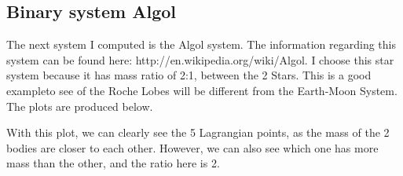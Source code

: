\documentclass{article}
\begin{document}
\subsection{Binary system Algol}
The next system I computed is the Algol system. The information regarding this system can be found here: http://en.wikipedia.org/wiki/Algol. I choose this star system because it has mass ratio of 2:1, between the 2 Stars. This is a good exampleto see of the Roche Lobes will be different from the Earth-Moon System. The plots are produced below.
\begin{figure}[H]
\end{figure}
With this plot, we can clearly see the 5 Lagrangian points, as the mass of the 2 bodies are closer to each other. However, we can also see which one has more mass than the other, and the ratio here is 2.
\begin{figure}[H]
\end{figure}
\end{document}

